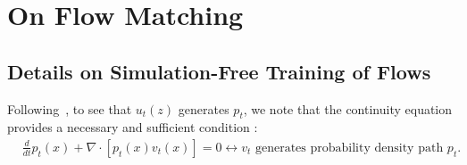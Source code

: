 %

%
%
%
%

%
%
%
%
%
%
%
%
%
%
%

%
%
%
%
%
%
%
%
%
%
%
%
%
%
%
%
%
%

%
%
%
%
%
%
%
%
%
%
%
%
%
%
%
%
%
%
%
%
%

%
%
%
%
%
%
%
%
%
%
%

%
%
%
%
%
%
%
%
%
%
%
%
%

%
%
%

%

%
%
%
%
%
%
%

%

%
%
%
%

%
%
%
%

%
%
%
%
%
%
%

%
%
%
%
%
%
%
%
%
%
%
%
%
%
%
%
%
%

%
%
%
%
%
%
%
%
%
%
%
%
%
%
%
%
%

%
%
%
%
%
%
%
%
%
%
%
%

%
%
%
%

%
%
%
%
%
%
%
%
%
%
%

%
%
%
%
%
%
%
%


%
%
%
%
%
%
%
%
%
%
%
%
%
%
%
%
%
%
%

%
%
%
%
%
%
%
%
%
%
%
%


%
%
%
%
%
%
%
%
%
%
%



%
%
%
%
%
%
%
%
%
%
%
%
%
%
%
%
%
%
%
%
%
%
%
%
%
%
%
\newcommand*\diff{\mathop{}\!\mathrm{d}}
\newcommand*\Diff[1]{\mathop{}\!\mathrm{d^#1}}
\DeclarePairedDelimiter\bra{\langle}{\rvert}
\DeclarePairedDelimiter\ket{\lvert}{\rangle}
\DeclarePairedDelimiterX{}

\newpage
 \section{On Flow Matching}
 \subsection{Details on Simulation-Free Training of Flows}
 \label{subsec:flowproofs}

Following~\citep{lipman2023flow}, to see that $u_t(z)$ generates $p_t$, we note that the continuity equation provides a necessary and sufficient condition \cite{Villani2008OptimalTO}:
\begin{align}
     & \frac{d}{dt} p_t(x) + \nabla \cdot [p_t(x) v_t(x)] = 0 \leftrightarrow  \text{$v_t$ generates probability density path $p_t$}. \label{eq:cont_eq}
\end{align}

